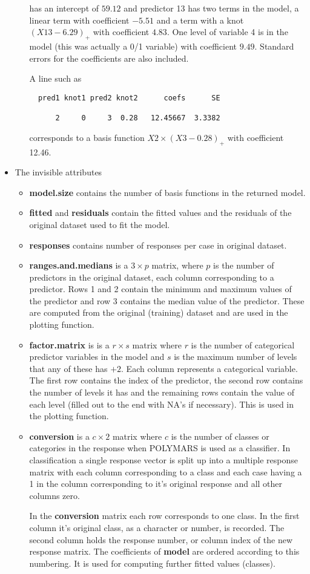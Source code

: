 \begin{itemize}
\begin{itemize}
has an intercept of $59.12$ and predictor 13 has two terms in the
model, a linear term with coefficient $-5.51$ and a term with a knot
$(X13-6.29)_+$ with coefficient $4.83$. One level of variable 4
is in the model (this was actually a 0/1 variable) with coefficient $9.49$.
Standard errors for the coefficients are also included.

A line such as
\begin{verbatim}
  pred1 knot1 pred2 knot2      coefs      SE 

      2     0     3  0.28   12.45667  3.3382
\end{verbatim} 
corresponds to a basis function $X2\times(X3-0.28)_+$ with coefficient
12.46.
\end{itemize}

\item The invisible attributes
\begin{itemize}
\item {\bf model.size} contains the number of basis functions in the
returned model.
\item {\bf fitted} and {\bf residuals} contain the fitted values and
the residuals of the original dataset used to fit the model.
\item {\bf responses} contains number of responses per case in original
dataset.
\item {\bf ranges.and.medians} is a $3\times p$ matrix, where $p$ is
the number of predictors in the original dataset, each column
corresponding to a predictor. Rows 1 and 2 contain the minimum and
maximum values of the predictor and row 3 contains the median value of
the predictor. These are computed from the original (training) dataset
and are used in the plotting function.
\item {\bf factor.matrix} is is a $r \times s$ matrix where $r$ is the
number of categorical predictor variables in the model and $s$ is the
maximum number of
levels that any of these has $+2$. Each column represents a categorical
variable. The first row contains the index of the predictor, the
second row contains the number of levels it has and the remaining rows
contain the value of each level (filled out to the end with NA's if necessary). 
This is used in the plotting function.

\item {\bf conversion} is a $c \times 2$ matrix where $c$ is the
number of classes or categories in the response when POLYMARS is used
as a classifier. In classification a single response vector is split
up into a multiple response matrix with each column corresponding to a
class and each case having a 1 in the column corresponding to it's
original response and all other columns zero. 

In the {\bf conversion} matrix each row corresponds to one class. In
the first column it's original class, as a character or number, is
recorded. The second column holds the response
number, or column index of the new response matrix. The coefficients of
{\bf model} are ordered according to this numbering. 
It is used for computing further fitted values (classes). 

\end{itemize}
\end{itemize}
